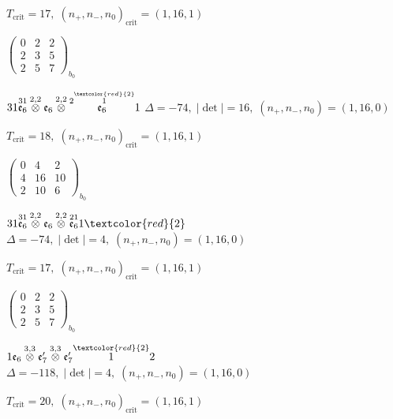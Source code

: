 \documentclass[10pt]{article}
\begin{document}
\hspace{1em}$T_{\text{crit}}=17,\; (n_+,n_-,n_0)_{\text{crit}}=(1,16,1)$

\hspace{2em}$\left(\begin{smallmatrix}0 & 2 & 2 \\ 2 & 3 & 5 \\ 2 & 5 & 7\end{smallmatrix}\right)_{\!b_0}$

\smallskip

$31\overset{31}{\mathfrak{e}_6}\overset{2,2}{\otimes}\mathfrak{e}_6\overset{2,2}{\otimes}\overset{2\overset{\textcolor{red}{2}}{1}}{\mathfrak{e}_6}1$ \quad $\Delta=-74,\; |\det|=16,\; (n_+,n_-,n_0)=(1,16,0)$

\hspace{1em}$T_{\text{crit}}=18,\; (n_+,n_-,n_0)_{\text{crit}}=(1,16,1)$

\hspace{2em}$\left(\begin{smallmatrix}0 & 4 & 2 \\ 4 & 16 & 10 \\ 2 & 10 & 6\end{smallmatrix}\right)_{\!b_0}$

$31\overset{31}{\mathfrak{e}_6}\overset{2,2}{\otimes}\mathfrak{e}_6\overset{2,2}{\otimes}\overset{21}{\mathfrak{e}_6}1\textcolor{red}{2}$ \quad $\Delta=-74,\; |\det|=4,\; (n_+,n_-,n_0)=(1,16,0)$

\hspace{1em}$T_{\text{crit}}=17,\; (n_+,n_-,n_0)_{\text{crit}}=(1,16,1)$

\hspace{2em}$\left(\begin{smallmatrix}0 & 2 & 2 \\ 2 & 3 & 5 \\ 2 & 5 & 7\end{smallmatrix}\right)_{\!b_0}$

\smallskip

$1\mathfrak{e}_6\overset{3,3}{\otimes}\mathfrak{e}_7'\overset{3,3}{\otimes}\mathfrak{e}_7'\overset{\textcolor{red}{2}}{1}2$ \quad $\Delta=-118,\; |\det|=4,\; (n_+,n_-,n_0)=(1,16,0)$

\hspace{1em}$T_{\text{crit}}=20,\; (n_+,n_-,n_0)_{\text{crit}}=(1,16,1)$
\end{document}
